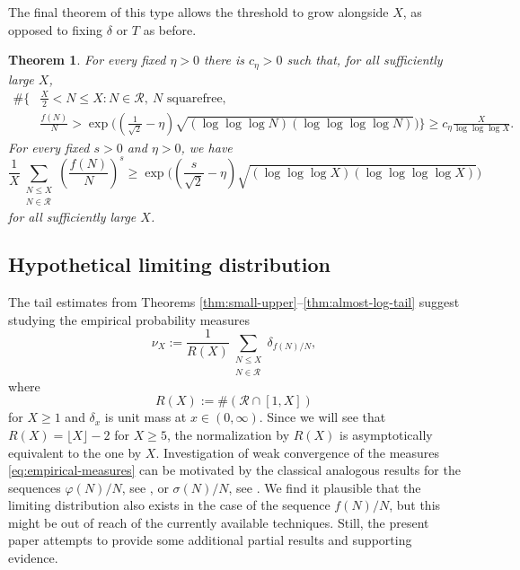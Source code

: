 \documentclass[11pt,letterpaper,reqno]{amsart}
\numberwithin{equation}{section}
\newtheorem{theorem}{Theorem}[section]
\theoremstyle{remark}
\newcommand{\N}{\mathbb{N}}
\newcommand{\Rcal}{\mathcal{R}}
\renewcommand{\leq}{\leqslant}
\renewcommand{\geq}{\geqslant}
\begin{document}
The final theorem of this type allows the threshold to grow alongside $X$, as opposed to fixing $\delta$ or $T$ as before.

\begin{theorem}
\label{thm:subexp-growth}
For every fixed $\eta>0$ there is $c_\eta>0$ such that, for all
sufficiently large $X$,
\begin{equation}\label{eq:subexp-growth}
\begin{aligned}
 \#\biggl\{ & \frac X2<N\leq X:N\in\Rcal,\ N\text{ squarefree},\\
 & \frac{f(N)}N>
 \exp\biggl(\left(\frac1{\sqrt2}-\eta\right)
 \sqrt{(\log\log\log N)(\log\log\log\log N)}\biggr)\biggr\}
 \geq c_\eta\frac X{\log\log\log X}.
\end{aligned}
\end{equation}
For every fixed $s>0$ and $\eta>0$, we have
\begin{equation}\label{eq:positive-moment-growth}
 \frac1X\sum_{\substack{N\leq X\\N\in\Rcal}}
 \left(\frac{f(N)}N\right)^s
 \geq\exp\biggl(\left(\frac{s}{\sqrt2}-\eta\right)
 \sqrt{(\log\log\log X)(\log\log\log\log X)}\biggr)
\end{equation}
for all sufficiently large $X$.
\end{theorem}

\subsection{Hypothetical limiting distribution}

The tail estimates from Theorems \ref{thm:small-upper}--\ref{thm:almost-log-tail} suggest studying the empirical probability measures
\begin{equation}\label{eq:empirical-measures}
 \nu_X:=\frac1{R(X)}
 \sum_{\substack{N\leq X\\N\in\Rcal}}\delta_{f(N)/N},
\end{equation}
where
\[ R(X):=\#(\Rcal\cap[1,X]) \]
for $X\geq1$ and $\delta_x$ is unit mass at $x\in(0,\infty)$.
Since we will see that $R(X)=\lfloor X\rfloor-2$ for $X\geq5$,
the normalization by $R(X)$ is asymptotically equivalent to the one by $X$.
Investigation of weak convergence of the measures \eqref{eq:empirical-measures} can be motivated by the classical analogous results for the sequences $\varphi(N)/N$, see \cite{Schoenberg}, or $\sigma(N)/N$, see \cite{Davenport}.
We find it plausible that the limiting distribution also exists in the case of the sequence $f(N)/N$, but this might be out of reach of the currently available techniques. Still, the present paper attempts to provide some additional partial results and supporting evidence.
\end{document}
